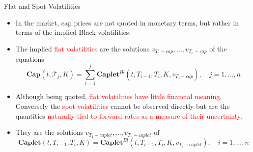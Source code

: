 \documentclass{beamer}
\begin{document}

\begin{frame}{Flat and Spot Volatilities}
\begin{itemize}
	\item<1-> In the market, cap prices are not quoted in monetary terms, but rather in terms of the implied Black volatilities. 
	\item<2-> The implied \textcolor{red}{flat volatilities} are the solutions $v_{T_1-cap},\ldots, v_{T_n-cap}$ of the equations
	\begin{equation*}
		\textbf{Cap}(t, \mathcal{T}_j, K) = \sum_{i=1}^j \textbf{Caplet}^{Bl}(t, T_{i-1}, T_i,K,v_{T_j-cap}),\quad j=1, \ldots,n
	\end{equation*}
	\item<3-> Although being quoted, \textcolor{red}{flat volatilities have little financial meaning}. Conversely the \textcolor{red}{spot volatilities} cannot be observed directly but are the quantities \textcolor{red}{naturally tied to forward rates as a measure of their uncertainty}.	
	\item<4-> They are the solutions $v_{T_1-caplet},\ldots, v_{T_n-caplet}$ of
	\begin{equation*}
		\textbf{Caplet}(t, T_{i-1},T_i,K) = \textbf{Caplet}^{Bl}(t, T_{i-1}, T_i,K,v_{T_i-caplet}),\quad i=1, \ldots,n
	\end{equation*} 
\end{itemize}
\end{frame}
\end{document}
